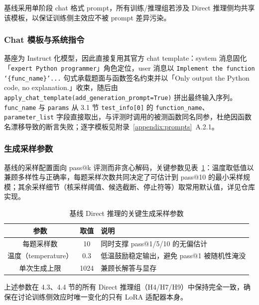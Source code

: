 
基线采用单阶段 chat 格式 prompt，所有训练/推理组若涉及 Direct 推理侧均共享该模板，以保证训练侧主效应不被 prompt 差异污染。

\subsubsection{Chat 模板与系统指令}
基座为 Instruct 化模型，因此直接复用其官方 chat template：system 消息固化「\texttt{expert Python programmer}」角色定位，user 消息以 \texttt{Implement the function `\{func\_name\}'...} 句式承载题面与函数签名约束并以「Only output the Python code, no explanation.」收束，随后由 \texttt{apply\_chat\_template(add\_generation\_prompt=True)} 拼出最终输入序列。\texttt{func\_name} 与 \texttt{params} 从 3.1 节 \texttt{test\_info[0]} 的 \texttt{function\_name}、\texttt{parameter\_list} 字段直接取出，与评测时调用的被测函数同名同参，杜绝因函数名漂移导致的断言失败；逐字模板见附录~\ref{appendix:prompts}~A.2.1。

\subsubsection{生成采样参数}
基线的采样配置面向 pass@k 评测而非贪心解码，关键参数见表~\ref{tab:ch4-base-sampling}：温度取低值以兼顾多样性与正确率，每题采样次数共同决定了可估计到 pass@10 的最小采样规模；其余采样细节（核采样阈值、候选截断、停止符等）取常用默认值，详见仓库实现。

\begin{table}[!htb]
  \centering
  \caption{基线 Direct 推理的关键生成采样参数}
  \label{tab:ch4-base-sampling}
  \footnotesize
  \begin{tabular}{c c p{8cm}}
    \toprule
    参数 & 取值 & 说明 \\
    \midrule
    每题采样数         & 10   & 同时支撑 pass@1/5/10 的无偏估计 \\
    温度（temperature） & 0.3  & 低温鼓励稳定输出，避免 pass@1 被随机性淹没 \\
    单次生成上限       & 1024 & 兼顾长解答与显存 \\
    \bottomrule
  \end{tabular}
\end{table}

上述参数在 4.3、4.4 节的所有 Direct 推理组（H4/H7/H9）中保持完全一致，确保在讨论训练侧效应时唯一变化的只有 LoRA 适配器本身。
